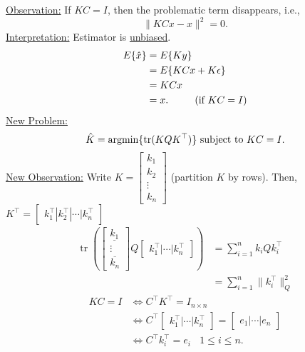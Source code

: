 \documentclass[letterpaper]{article}
\begin{document}
    \newline\newline
    \underline{Observation:} If $KC=I$, then the problematic term disappears, i.e.,
    \begin{equation*}
        \|KCx-x\|^2=0.
    \end{equation*}
    \underline{Interpretation:} Estimator is \underline{unbiased}.
    \begin{align*}
        E\{\hat{x}\}&=E\{Ky\}\\
        &=E\{KCx+K\epsilon\}\\
        &=KCx\\
        &=x.\ \ \ \ \ \ \ \ (\textnormal{if }KC=I)
    \end{align*}
    \underline{New Problem:}~
    \begin{equation*}
        \hat{K}=\operatorname{argmin}\{\operatorname{tr}(KQK^\top )\}\textnormal{ subject to }KC=I.
    \end{equation*}
    \underline{New Observation:}
    \newline\newline
    Write $K = \begin{bmatrix}
        k_1\\
        k_2\\
        \vdots\\
        k_n
    \end{bmatrix}$ (partition $K$ by rows).
    \newline\newline
    Then, $K^\top =\begin{bmatrix}
        k_1^\top | k_2^\top  | \dotsb | k_n^\top
    \end{bmatrix}$
    \begin{align*}
        \operatorname{tr}\left(\begin{bmatrix}
            \underline{k_1}\\
            \vdots\\
            \overline{k_n}
            \end{bmatrix}Q\begin{bmatrix}k_1^\top|\dotsb|k_n^\top\end{bmatrix}\right) &=\sum^{n}_{i=1}k_iQk_i^\top\\
        &=\sum^{n}_{i=1}\|k_i^\top\|_Q^2
    \end{align*}
    \begin{align*}
        KC=I &\Leftrightarrow C^\top K^\top =I_{n\times n}\\
        &\Leftrightarrow C^\top \begin{bmatrix}k_1^\top|\dotsb|k_n^\top\end{bmatrix}=\begin{bmatrix}e_1|\dotsb|e_n\end{bmatrix}\\
        &\Leftrightarrow C^\top k_i^\top=e_i\ \ \ \ 1\leq i\leq n.
    \end{align*}
\end{document}
